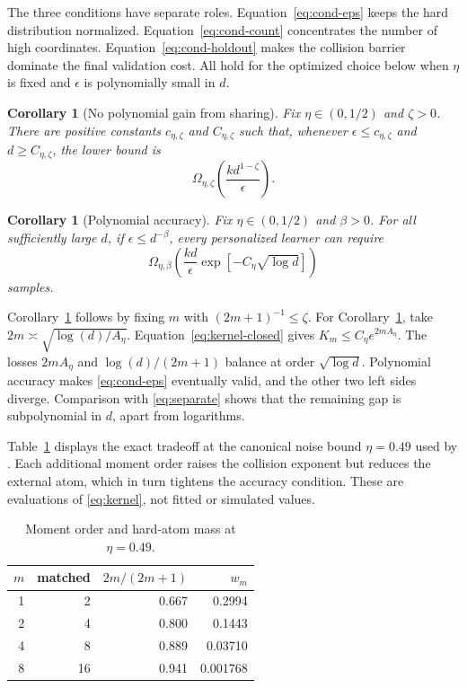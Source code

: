 \documentclass[twoside]{article}
\newtheorem{corollary}[theorem]{Corollary}
\newcommand{\1}{\mathbf 1}
\begin{document}
The three conditions have separate roles. Equation~\eqref{eq:cond-eps} keeps the hard distribution normalized. Equation~\eqref{eq:cond-count} concentrates the number of high coordinates. Equation~\eqref{eq:cond-holdout} makes the collision barrier dominate the final validation cost. All hold for the optimized choice below when $\eta$ is fixed and $\epsilon$ is polynomially small in $d$.

\begin{corollary}[No polynomial gain from sharing]
\label{cor:power}
Fix $\eta\in(0,1/2)$ and $\zeta>0$. There are positive constants $c_{\eta,\zeta}$ and $C_{\eta,\zeta}$ such that, whenever $\epsilon\le c_{\eta,\zeta}$ and $d\ge C_{\eta,\zeta}$, the lower bound is
\begin{equation}
 \Omega_{\eta,\zeta}\!\left(\frac{k d^{1-\zeta}}{\epsilon}\right).
 \label{eq:power}
\end{equation}
\end{corollary}

\begin{corollary}[Polynomial accuracy]
\label{cor:optimized}
Fix $\eta\in(0,1/2)$ and $\beta>0$. For all sufficiently large $d$, if $\epsilon\le d^{-\beta}$, every personalized learner can require
\begin{equation}
 \Omega_{\eta,\beta}\!\left(
 \frac{kd}{\epsilon}
 \exp[-C_\eta\sqrt{\log d}]
 \right)
 \label{eq:optimized}
\end{equation}
samples.
\end{corollary}

Corollary~\ref{cor:power} follows by fixing $m$ with $(2m+1)^{-1}\le\zeta$. For Corollary~\ref{cor:optimized}, take $2m\asymp\sqrt{\log(d)/A_\eta}$. Equation~\eqref{eq:kernel-closed} gives $K_m\le C_\eta e^{2mA_\eta}$. The losses $2mA_\eta$ and $\log(d)/(2m+1)$ balance at order $\sqrt{\log d}$. Polynomial accuracy makes \eqref{eq:cond-eps} eventually valid, and the other two left sides diverge. Comparison with \eqref{eq:separate} shows that the remaining gap is subpolynomial in $d$, apart from logarithms.

Table~\ref{tab:orders} displays the exact tradeoff at the canonical noise bound $\eta=0.49$ used by \citet{hanashiro2026bounded}. Each additional moment order raises the collision exponent but reduces the external atom, which in turn tightens the accuracy condition. These are evaluations of \eqref{eq:kernel}, not fitted or simulated values.

\begin{table}[t]
\centering
\caption{Moment order and hard-atom mass at $\eta=0.49$.}
\label{tab:orders}
\begin{tabular}{@{}rrrr@{}}
\toprule
$m$ & matched & $2m/(2m+1)$ & $w_m$ \\
\midrule
1 & 2  & 0.667 & 0.2994 \\
2 & 4  & 0.800 & 0.1443 \\
4 & 8  & 0.889 & 0.03710 \\
8 & 16 & 0.941 & 0.001768 \\
\bottomrule
\end{tabular}
\end{table}
\end{document}
